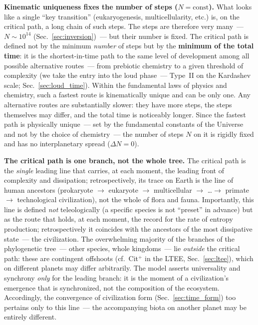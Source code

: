 \documentclass[11pt,a4paper]{article}
\begin{document}
\textbf{Kinematic uniqueness fixes the number of steps ($N = \mathrm{const}$).} What looks like a single ``key transition'' (eukaryogenesis, multicellularity, etc.) is, on the critical path, a long chain of such steps. The steps are therefore very many~--- $N \sim 10^{14}$ (Sec.~\ref{sec:inversion})~--- but their number is fixed. The critical path is defined not by the minimum \emph{number} of steps but by the \textbf{minimum of the total time}: it is the shortest-in-time path to the same level of development among all possible alternative routes~--- from prebiotic chemistry to a given threshold of complexity (we take the entry into the loud phase~--- Type~II on the Kardashev scale; Sec.~\ref{sec:loud_time}). Within the fundamental laws of physics and chemistry, such a fastest route is kinematically unique and can be only one. Any alternative routes are substantially slower: they have more steps, the steps themselves may differ, and the total time is noticeably longer. Since the fastest path is physically unique~--- set by the fundamental constants of the Universe and not by the choice of chemistry~--- the number of steps $N$ on it is rigidly fixed and has no interplanetary spread ($\Delta N = 0$).

\textbf{The critical path is one branch, not the whole tree.} The critical path is the \emph{single} leading line that carries, at each moment, the leading front of complexity and dissipation; retrospectively, its trace on Earth is the line of human ancestors (prokaryote $\to$ eukaryote $\to$ multicellular $\to$ \ldots $\to$ primate $\to$ technological civilization), not the whole of flora and fauna. Importantly, this line is defined \emph{not} teleologically (a specific species is not ``preset'' in advance) but as the route that holds, at each moment, the record for the rate of entropy production; retrospectively it coincides with the ancestors of the most dissipative state~--- the civilization. The overwhelming majority of the branches of the phylogenetic tree~--- other species, whole kingdoms~--- lie \emph{outside} the critical path: these are contingent offshoots (cf.\ Cit$^+$ in the LTEE, Sec.~\ref{sec:ltee}), which on different planets may differ arbitrarily. The model asserts universality and synchrony \emph{only} for the leading branch: it is the moment of a civilization's emergence that is synchronized, not the composition of the ecosystem. Accordingly, the convergence of civilization form (Sec.~\ref{sec:time_form}) too pertains only to this line~--- the accompanying biota on another planet may be entirely different.
\end{document}
